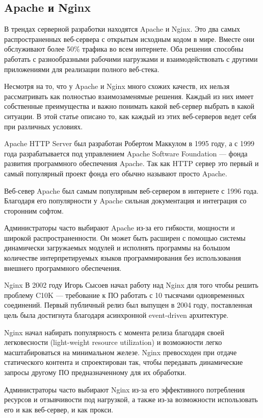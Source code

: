 \subsection{Apache и Nginx}
\label{sec:analysis:apache_nginx}

В трендах серверной разработки находятся Apache и Nginx. Это два самых распространенных веб-сервера с открытым исходным кодом в мире. Вместе они обслуживают более 50\% трафика во всем интернете. Оба решения способны работать с разнообразными рабочими нагрузками и взаимодействовать с другими приложениями для реализации полного веб-стека.

Несмотря на то, что у Apache и Nginx много схожих качеств, их нельзя рассматривать как полностью взаимозаменямые решения. Каждый из них имеет собственные преимущества и важно понимать какой веб-сервер выбрать в какой ситуации. В этой статье описано то, как каждый из этих веб-серверов ведет себя при различных условиях.

Apache HTTP Server был разработан Робертом Маккулом в 1995 году, а с 1999 года разрабатывается под управлением Apache Software Foundation — фонда развития программного обеспечения Apache. Так как HTTP сервер это первый и самый популярный проект фонда его обычно называют просто Apache.

Веб-север Apache был самым популярным веб-сервером в интернете с 1996 года. Благодаря его популярности у Apache сильная документация и интеграция со сторонним софтом.

Администраторы часто выбирают Apache из-за его гибкости, мощности и широкой распространенности. Он может быть расширен с помощью системы динамически загружаемых модулей и исполнять программы на большом количестве интерпретируемых языков программирования без использования внешнего программного обеспечения.

Nginx В 2002 году Игорь Сысоев начал работу над Nginx для того чтобы решить проблему C10K — требование к ПО работать с 10 тысячами одновременных соединений. Первый публичный релиз был выпущен в 2004 году, поставленная цель была достигнута благодаря асинхронной event-driven архитектуре.

Nginx начал набирать популярность с момента релиза благодаря своей легковесности (light-weight resource utilization) и возможности легко масштабироваться на минимальном железе. Nginx превосходен при отдаче статического контента и спроектирован так, чтобы передавать динамические запросы другому ПО предназначенному для их обработки.

Администраторы часто выбирают Nginx из-за его эффективного потребления ресурсов и отзывчивости под нагрузкой, а также из-за возможности использовать его и как веб-сервер, и как прокси.

